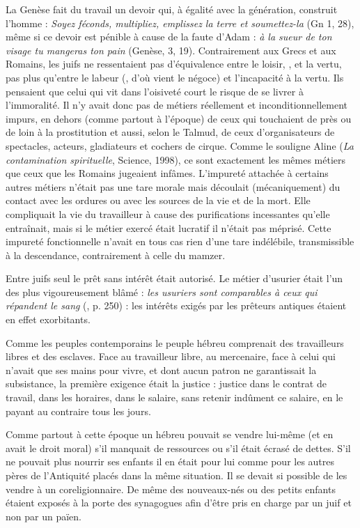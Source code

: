  La Genèse fait du travail un devoir qui, à égalité avec la génération, construit l'homme : {\emph{Soyez féconds, multipliez, emplissez la terre et soumettez-la}} (Gn 1, 28), même si ce devoir est pénible à cause de la faute d'Adam : {\emph{à la sueur de ton visage tu mangeras ton pain}} (Genèse, 3, 19). Contrairement aux Grecs et aux Romains, les juifs ne ressentaient pas d'équivalence entre le loisir, {}, et la vertu, pas plus qu'entre le labeur ({}, d'où vient le négoce) et l'incapacité à la vertu. Ils pensaient que celui qui vit dans l'oisiveté court le risque de se livrer à l'immoralité. Il n'y avait donc pas de métiers réellement et inconditionnellement impurs, en dehors (comme partout à l'époque) de ceux qui touchaient de près ou de loin à la prostitution et aussi, selon le Talmud, de ceux d'organisateurs de spectacles, acteurs, gladiateurs et cochers de cirque. Comme le souligne Aline  (\emph{La contamination spirituelle}, Science, 1998), ce sont exactement les mêmes métiers que ceux que les Romains jugeaient infâmes. L'impureté attachée à certains autres métiers n'était pas une tare morale mais découlait (mécaniquement) du contact avec les ordures ou avec les sources de la vie et de la mort. Elle compliquait la vie du travailleur à cause des purifications incessantes qu'elle entraînait, mais si le métier exercé était lucratif il n'était pas méprisé. Cette impureté fonctionnelle n'avait en tous cas rien d'une tare indélébile, transmissible à la descendance, contrairement à celle du mamzer.
 
  Entre juifs seul le prêt sans intérêt était autorisé. Le métier d'usurier était l'un des plus vigoureusement blâmé : {\emph{les usuriers sont comparables à ceux qui répandent le sang}} (, p. 250) : les intérêts exigés par les prêteurs antiques étaient en effet exorbitants. 

 Comme les peuples contemporains le peuple hébreu comprenait des travailleurs libres et des esclaves. Face au travailleur libre, au mercenaire, face à celui qui n'avait que ses mains pour vivre, et dont aucun patron ne garantissait la subsistance, la première exigence était la justice : justice dans le contrat de travail, dans les horaires, dans le salaire, sans retenir indûment ce salaire, en le payant au contraire tous les jours.

 Comme partout à cette époque un hébreu pouvait se vendre lui-même (et en avait le droit moral) s'il manquait de ressources ou s'il était écrasé de dettes. S'il ne pouvait plus nourrir ses enfants il en était pour lui comme pour les autres pères de l'Antiquité placés dans la même situation. Il se devait si possible de les vendre à un coreligionnaire. De même des nouveaux-nés ou des petits enfants étaient exposés à la porte des synagogues afin d'être pris en charge par un juif et non par un païen. 

